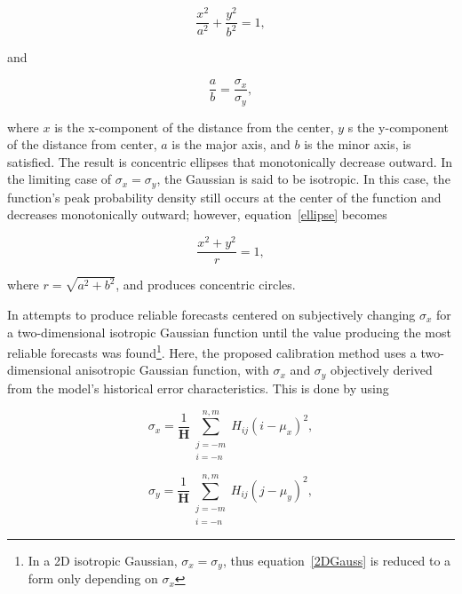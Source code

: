     \begin{equation}
        \label{ellipse}
        \frac{x^2}{a^2} + \frac{y^2}{b^2} = 1,
    \end{equation}

\noindent and

    \begin{equation}
        \frac{a}{b} = \frac{\sigma_x}{\sigma_y},
    \end{equation}

\noindent where $x$ is the x-component of the distance from the center, $y$ s the y-component of the distance from center, $a$ is the major axis, and $b$ is the minor axis, is satisfied. The result is concentric ellipses that monotonically decrease outward. In the limiting case of $\sigma_x = \sigma_y$, the Gaussian is said to be isotropic. In this case, the function's peak probability density still occurs at the center of the function and decreases monotonically outward; however, \mbox{equation \ref{ellipse}} becomes

    \begin{equation*}
        \frac{x^2 + y^2}{r} = 1,
    \end{equation*}

\noindent where $r = \sqrt{a^2 + b^2}$, and produces concentric circles.

In \cite{Sobash2011} attempts to produce reliable forecasts centered on subjectively changing $\sigma_x$ for a two-dimensional isotropic Gaussian function until the value producing the most reliable forecasts was found\footnote{In a 2D isotropic Gaussian, $\sigma_x = \sigma_y$, thus \mbox{equation \ref{2DGauss}} is reduced to a form only depending on $\sigma_x$}. Here, the proposed calibration method uses a two-dimensional anisotropic Gaussian function, with $\sigma_x$ and $\sigma_y$ objectively derived from the model's historical error characteristics. This is done by using

    \begin{equation}
        \label{sigmax}
        \sigma_x = \frac{1}{\mathbf{H}} \sum\limits_{\substack{j=-m \\ i=-n}}^{n,m}H_{ij}(i - \mu_x)^2,
    \end{equation}

    \begin{equation}
        \label{sigmay}
        \sigma_y = \frac{1}{\mathbf{H}} \sum\limits_{\substack{j=-m \\ i=-n}}^{n,m}H_{ij}(j - \mu_y)^2,
    \end{equation}

